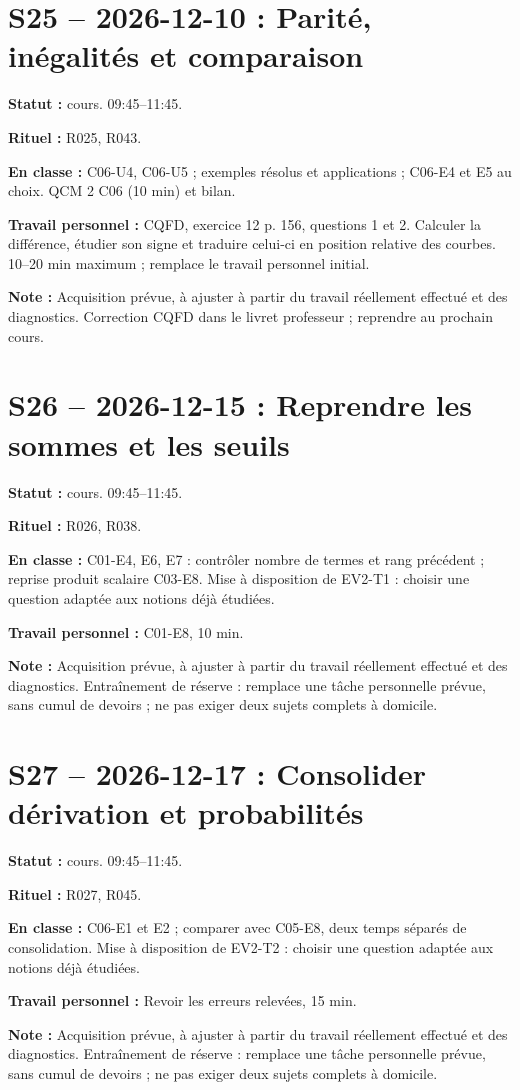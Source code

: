 \section*{S25 -- 2026-12-10 : Parité, inégalités et comparaison}
\textbf{Statut :} cours. 09:45–11:45.\par\textbf{Rituel :} R025, R043.\par\textbf{En classe :} C06-U4, C06-U5 ; exemples résolus et applications ; C06-E4 et E5 au choix.  QCM 2 C06 (10 min) et bilan.\par\textbf{Travail personnel :} CQFD, exercice 12 p. 156, questions 1 et 2. Calculer la différence, étudier son signe et traduire celui-ci en position relative des courbes. 10–20 min maximum ; remplace le travail personnel initial.\par\textbf{Note :} Acquisition prévue, à ajuster à partir du travail réellement effectué et des diagnostics. Correction CQFD dans le livret professeur ; reprendre au prochain cours.
\section*{S26 -- 2026-12-15 : Reprendre les sommes et les seuils}
\textbf{Statut :} cours. 09:45–11:45.\par\textbf{Rituel :} R026, R038.\par\textbf{En classe :} C01-E4, E6, E7 : contrôler nombre de termes et rang précédent ; reprise produit scalaire C03-E8. Mise à disposition de EV2-T1 : choisir une question adaptée aux notions déjà étudiées.\par\textbf{Travail personnel :} C01-E8, 10 min.\par\textbf{Note :} Acquisition prévue, à ajuster à partir du travail réellement effectué et des diagnostics. Entraînement de réserve : remplace une tâche personnelle prévue, sans cumul de devoirs ; ne pas exiger deux sujets complets à domicile.
\section*{S27 -- 2026-12-17 : Consolider dérivation et probabilités}
\textbf{Statut :} cours. 09:45–11:45.\par\textbf{Rituel :} R027, R045.\par\textbf{En classe :} C06-E1 et E2 ; comparer avec C05-E8, deux temps séparés de consolidation. Mise à disposition de EV2-T2 : choisir une question adaptée aux notions déjà étudiées.\par\textbf{Travail personnel :} Revoir les erreurs relevées, 15 min.\par\textbf{Note :} Acquisition prévue, à ajuster à partir du travail réellement effectué et des diagnostics. Entraînement de réserve : remplace une tâche personnelle prévue, sans cumul de devoirs ; ne pas exiger deux sujets complets à domicile.
